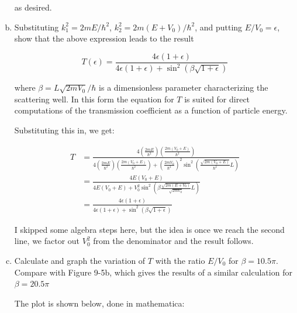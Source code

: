 \documentclass[10pt]{article}
\begin{document}
\begin{enumerate}[(a)]
\begin{solution}
            as desired.
        \end{solution}

        \item Substituting $k_1^2 = 2mE/\hbar^2$, $k_2^2 = 2m(E + V_0)/\hbar^2$, and putting $E/V_0 = \epsilon$, show that the above expression leads to the result
        
        \[ T(\epsilon) = \frac{4\epsilon(1 + \epsilon)}{4\epsilon(1 + \epsilon) + \sin^2(\beta \sqrt{1 + \epsilon})}\] 

        where $\beta = L \sqrt{2mV_0}/\hbar$ is a dimensionless parameter characterizing the scattering well. In this form the equation for $T$ is suited for direct computations of the transmission coefficient as a function of particle energy.

        \begin{solution}
            Substituting this in, we get: 

            \begin{align*}
                T &= \frac{4 \left( \frac{2mE}{\hbar^2}\right)\left( \frac{2m(V_0 + E)}{\hbar^2}\right)}{4 \left( \frac{2mE}{\hbar^2}\right)\left( \frac{2m(V_0 + E)}{\hbar^2}\right) + \left( \frac{2mV_0}{\hbar^2}\right)^2 \sin^2\left( \frac{\sqrt{2m(V_0 + E)}}{\hbar^2}L\right)}\\
                &= \frac{4E(V_0 + E)}{4E(V_0 + E) + V_0^2 \sin^2\left(\beta \frac{\sqrt{2m(E + V_0)}}{\sqrt{2mV_0}} L\right)}\\
                &= \frac{4\epsilon(1 + \epsilon)}{4\epsilon(1 + \epsilon) + \sin^2(\beta \sqrt{1 + \epsilon})}
            \end{align*}

            I skipped some algebra steps here, but the idea is once we reach the second line, we factor out $V_0^2$ from the denominator and the result follows.
        \end{solution}

        \item Calculate and graph the variation of $T$ with the ratio $E/V_0$ for $\beta = 10.5 \pi$. Compare with Figure 9-5b, which gives the results of a similar calculation for $\beta = 20.5\pi$
        
        \begin{solution}
            The plot is shown below, done in mathematica: 


\end{solution}
\end{enumerate}
\end{document}
